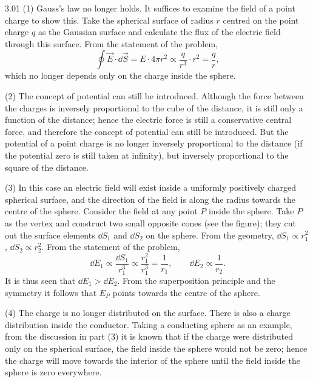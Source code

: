 \begin{solution}{3.01}
(1) Gauss's law no longer holds. It suffices to examine the field of a point charge to show this. Take the spherical surface of radius $r$ centred on the point charge $q$ as the Gaussian surface and calculate the flux of the electric field through this surface. From the statement of the problem,
\[
\oint \vec{E}\cdot\dd\vec{S}=E\cdot 4\pi r^2\propto \frac{q}{r^3}\cdot r^2=\frac{q}{r},
\]
which no longer depends only on the charge inside the sphere.

(2) The concept of potential can still be introduced. Although the force between the charges is inversely proportional to the cube of the distance, it is still only a function of the distance; hence the electric force is still a conservative central force, and therefore the concept of potential can still be introduced. But the potential of a point charge is no longer inversely proportional to the distance (if the potential zero is still taken at infinity), but inversely proportional to the square of the distance.

(3) In this case an electric field will exist inside a uniformly positively charged spherical surface, and the direction of the field is along the radius towards the centre of the sphere. Consider the field at any point $P$ inside the sphere. Take $P$ as the vertex and construct two small opposite cones (see the figure); they cut out the surface elements $\dd S_1$ and $\dd S_2$ on the sphere. From the geometry, $\dd S_1\propto r_1^2$, $\dd S_2\propto r_2^2$. From the statement of the problem,
\[
\dd E_1\propto\frac{\dd S_1}{r_1^3}\propto\frac{r_1^2}{r_1^3}=\frac{1}{r_1},
\qquad
\dd E_2\propto\frac{1}{r_2}.
\]
It is thus seen that $\dd E_1>\dd E_2$. From the superposition principle and the symmetry it follows that $E_P$ points towards the centre of the sphere.

(4) The charge is no longer distributed on the surface. There is also a charge distribution inside the conductor. Taking a conducting sphere as an example, from the discussion in part (3) it is known that if the charge were distributed only on the spherical surface, the field inside the sphere would not be zero; hence the charge will move towards the interior of the sphere until the field inside the sphere is zero everywhere.


\end{solution}
